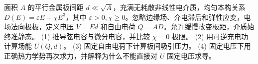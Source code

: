 面积 \(A\) 的平行金属板间距 \(d\ll\sqrt A\)，充满无耗散非线性电介质，均匀本构关系 \(D(E)=\varepsilon E+\chi E^3\)，其中 \(\varepsilon>0,\chi\ge0\)。忽略边缘场、介电滞后和弹性应变，电场法向极板，定义电压 \(V=Ed\) 和自由电荷 \(Q=AD\)。允许缓慢改变板距，介质始终准静态。
(1) 推导弦电容与微分电容，并比较 \(\chi=0\) 极限。
(2) 用可逆充电功计算场能 \(U(Q,d)\)。
(3) 固定自由电荷下计算板间吸引压力。
(4) 固定电压下用正确热力学势再次求力，并解释为什么不能直接对 \(U\) 固定电压求导。
